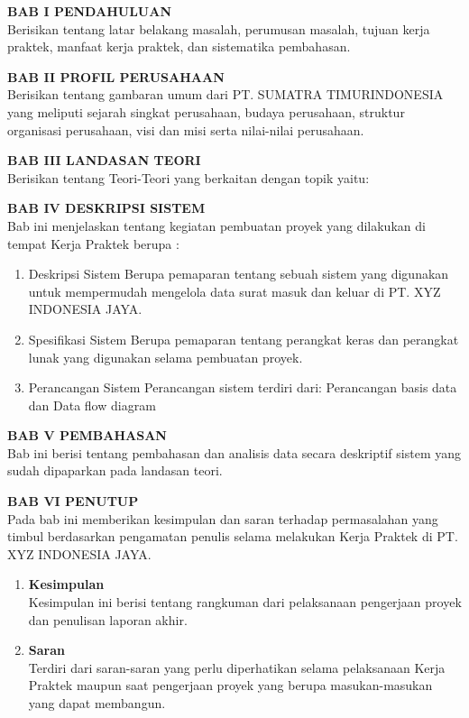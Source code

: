 \vspace{0.5cm}
\noindent \textbf{BAB I PENDAHULUAN} \\
Berisikan tentang latar belakang masalah, perumusan masalah, tujuan kerja praktek, manfaat kerja praktek, dan sistematika pembahasan.

\vspace{0.5cm}
\noindent \textbf{BAB II PROFIL PERUSAHAAN} \\
Berisikan tentang gambaran umum dari PT. SUMATRA TIMURINDONESIA yang meliputi sejarah singkat perusahaan, budaya perusahaan, struktur organisasi perusahaan, visi dan misi serta nilai-nilai perusahaan.

\vspace{0.5cm}
\noindent \textbf{BAB III LANDASAN TEORI} \\
Berisikan tentang Teori-Teori yang berkaitan dengan topik yaitu:

\vspace{0.5cm}
\noindent \textbf{BAB IV DESKRIPSI SISTEM} \\
Bab ini menjelaskan tentang kegiatan pembuatan proyek yang dilakukan di tempat Kerja Praktek berupa :
\begin{enumerate}
      \item Deskripsi Sistem Berupa pemaparan tentang sebuah sistem yang digunakan untuk mempermudah mengelola data surat masuk dan keluar di PT. XYZ INDONESIA JAYA.
      \item Spesifikasi Sistem Berupa pemaparan tentang perangkat keras dan perangkat lunak yang digunakan selama pembuatan proyek.
      \item Perancangan Sistem Perancangan sistem terdiri dari: Perancangan basis data dan Data flow diagram
\end{enumerate}

\vspace{0.5cm}
\noindent \textbf{BAB V PEMBAHASAN} \\
Bab ini berisi tentang pembahasan dan analisis data secara deskriptif sistem yang sudah dipaparkan pada landasan teori.

\vspace{0.5cm}
\noindent \textbf{BAB VI PENUTUP} \\
Pada bab ini memberikan kesimpulan dan saran terhadap permasalahan yang timbul berdasarkan pengamatan penulis selama melakukan Kerja Praktek di PT. XYZ INDONESIA JAYA.
\begin{enumerate}
      \item \textbf{Kesimpulan} \\
            Kesimpulan ini berisi tentang rangkuman dari pelaksanaan pengerjaan proyek dan penulisan laporan akhir.
      \item \textbf{Saran} \\
            Terdiri dari saran-saran yang perlu diperhatikan selama pelaksanaan Kerja Praktek maupun saat pengerjaan proyek yang berupa masukan-masukan yang dapat membangun.
\end{enumerate}

